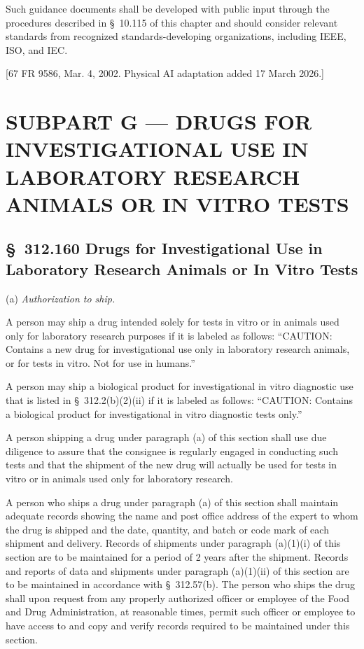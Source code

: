 Such guidance documents shall be developed with public input through the procedures described in \S~10.115 of this chapter and should consider relevant standards from recognized standards-developing organizations, including IEEE, ISO, and IEC.

[67 FR 9586, Mar. 4, 2002. Physical AI adaptation added 17 March 2026.]

\clearpage

\section{SUBPART G --- DRUGS FOR INVESTIGATIONAL USE IN LABORATORY RESEARCH ANIMALS OR IN VITRO TESTS}

\subsection{\S~312.160 Drugs for Investigational Use in Laboratory Research Animals or In Vitro Tests}

(a) \textit{Authorization to ship.}

\begin{description}[leftmargin=0.5cm,style=sameline]
\item[(1)] \hfill
\begin{description}[leftmargin=0.8cm,style=sameline]
\item[(i)] A person may ship a drug intended solely for tests in vitro or in animals used only for laboratory research purposes if it is labeled as follows: ``CAUTION: Contains a new drug for investigational use only in laboratory research animals, or for tests in vitro. Not for use in humans.''
\item[(ii)] A person may ship a biological product for investigational in vitro diagnostic use that is listed in \S~312.2(b)(2)(ii) if it is labeled as follows: ``CAUTION: Contains a biological product for investigational in vitro diagnostic tests only.''
\end{description}
\item[(2)] A person shipping a drug under paragraph (a) of this section shall use due diligence to assure that the consignee is regularly engaged in conducting such tests and that the shipment of the new drug will actually be used for tests in vitro or in animals used only for laboratory research.
\item[(3)] A person who ships a drug under paragraph (a) of this section shall maintain adequate records showing the name and post office address of the expert to whom the drug is shipped and the date, quantity, and batch or code mark of each shipment and delivery. Records of shipments under paragraph (a)(1)(i) of this section are to be maintained for a period of 2 years after the shipment. Records and reports of data and shipments under paragraph (a)(1)(ii) of this section are to be maintained in accordance with \S~312.57(b). The person who ships the drug shall upon request from any properly authorized officer or employee of the Food and Drug Administration, at reasonable times, permit such officer or employee to have access to and copy and verify records required to be maintained under this section.
\end{description}

